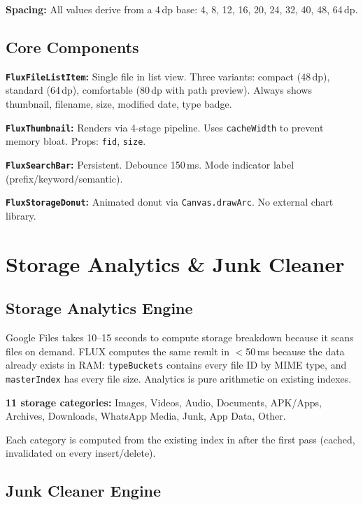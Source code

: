 \textbf{Spacing:} All values derive from a 4\,dp base: 4, 8, 12, 16, 20, 24, 32, 40, 48, 64\,dp.

\section{Core Components}

\textbf{\texttt{FluxFileListItem}:} Single file in list view. Three variants: compact (48\,dp), standard (64\,dp), comfortable (80\,dp with path preview). Always shows thumbnail, filename, size, modified date, type badge.

\textbf{\texttt{FluxThumbnail}:} Renders via 4-stage pipeline. Uses \texttt{cacheWidth} to prevent memory bloat. Props: \texttt{fid}, \texttt{size}.

\textbf{\texttt{FluxSearchBar}:} Persistent. Debounce 150\,ms. Mode indicator label (prefix/keyword/semantic).

\textbf{\texttt{FluxStorageDonut}:} Animated donut via \texttt{Canvas.drawArc}. No external chart library.

\chapter{Storage Analytics \& Junk Cleaner}

\section{Storage Analytics Engine}

\begin{insightbox}[title={Why FLUX Analytics is 300$\times$ Faster}]
Google Files takes 10--15 seconds to compute storage breakdown because it scans files on demand. FLUX computes the same result in $<$50\,ms because the data already exists in RAM: \texttt{typeBuckets} contains every file ID by MIME type, and \texttt{masterIndex} has every file size. Analytics is pure arithmetic on existing indexes.
\end{insightbox}

\textbf{11 storage categories:} Images, Videos, Audio, Documents, APK/Apps, Archives, Downloads, WhatsApp Media, Junk, App Data, Other.

Each category is computed from the existing index in  after the first  pass (cached, invalidated on every insert/delete).

\section{Junk Cleaner Engine}

